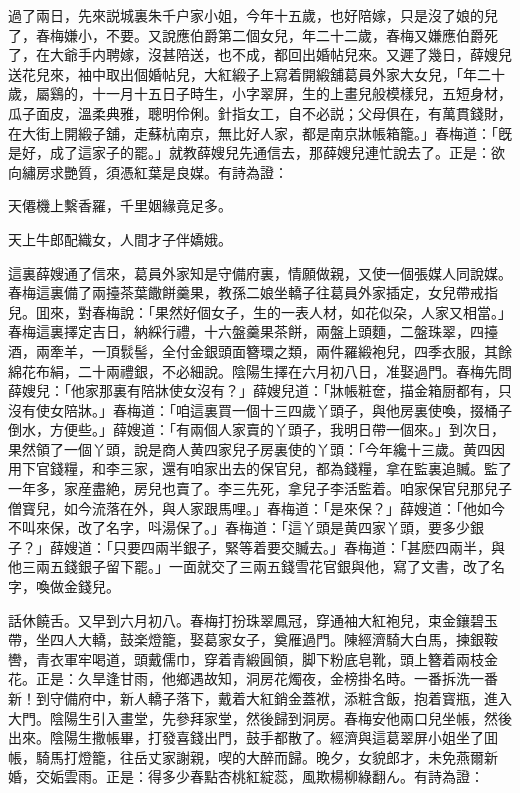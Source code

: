過了兩日，先來説城裏朱千户家小姐，今年十五歲，也好陪嫁，只是沒了娘的兒了，春梅嫌小，不要。又說應伯爵第二個女兒，年二十二歲，春梅又嫌應伯爵死了，在大爺手内聘嫁，沒甚陪送，也不成，都回出婚帖兒來。又遲了幾日，薛嫂兒送花兒來，袖中取出個婚帖兒，大紅緞子上寫着開緞舖葛員外家大女兒，「年二十歲，屬鷄的，十一月十五日子時生，小字翠屏，生的上畫兒般模樣兒，五短身材，瓜子面皮，溫柔典雅，聰明伶俐。針指女工，自不必説；父母俱在，有萬貫錢財，在大街上開緞子舖，走蘇杭南京，無比好人家，都是南京牀帳箱籠。」春梅道：「旣是好，成了這家子的罷。」就教薛嫂兒先通信去，那薛嫂兒連忙說去了。正是：欲向繡房求艷質，須憑紅葉是良媒。有詩為證：

天僊機上繫香羅，千里姻緣竟足多。

天上牛郎配織女，人間才子伴嬌娥。

這裏薛嫂通了信來，葛員外家知是守備府裏，情願做親，又使一個張媒人同說媒。春梅這裏備了兩擡茶葉饊餅羹果，教孫二娘坐轎子往葛員外家插定，女兒帶戒指兒。囬來，對春梅說：「果然好個女子，生的一表人材，如花似朶，人家又相當。」春梅這裏擇定吉日，納綵行禮，十六盤羹果茶餅，兩盤上頭麵，二盤珠翠，四擡酒，兩牽羊，一頂䯼髻，全付金銀頭面簪環之類，兩件羅緞袍兒，四季衣服，其餘綿花布絹，二十兩禮銀，不必細說。陰陽生擇在六月初八日，准娶過門。春梅先問薛嫂兒：「他家那裏有陪牀使女沒有？」薛嫂兒道：「牀帳粧奩，描金箱厨都有，只沒有使女陪牀。」春梅道：「咱這裏買一個十三四歲丫頭子，與他房裏使喚，掇桶子倒水，方便些。」薛嫂道：「有兩個人家賣的丫頭子，我明日帶一個來。」到次日，果然領了一個丫頭，說是商人黄四家兒子房裏使的丫頭：「今年纔十三歲。黄四因用下官錢糧，和李三家，還有咱家出去的保官兒，都為錢糧，拿在監裏追贓。監了一年多，家産盡絶，房兒也賣了。李三先死，拿兒子李活監着。咱家保官兒那兒子僧寳兒，如今流落在外，與人家跟馬哩。」春梅道：「是來保？」薛嫂道：「他如今不叫來保，改了名字，呌湯保了。」春梅道：「這丫頭是黄四家丫頭，要多少銀子？」薛嫂道：「只要四兩半銀子，緊等着要交贓去。」春梅道：「甚麽四兩半，與他三兩五錢銀子留下罷。」一面就交了三兩五錢雪花官銀與他，寫了文書，改了名字，喚做金錢兒。

話休饒舌。又早到六月初八。春梅打扮珠翠鳳冠，穿通袖大紅袍兒，束金鑲碧玉帶，坐四人大轎，鼓楽燈籠，娶葛家女子，奠雁過門。陳經濟騎大白馬，揀銀鞍轡，青衣軍牢喝道，頭戴儒巾，穿着青緞圓領，脚下粉底皂靴，頭上簪着兩枝金花。正是：久旱逢甘雨，他鄉遇故知，洞房花燭夜，金榜掛名時。一番拆洗一番新！到守備府中，新人轎子落下，戴着大紅銷金蓋袱，添粧含飯，抱着寳瓶，進入大門。陰陽生引入畫堂，先參拜家堂，然後歸到洞房。春梅安他兩口兒坐帳，然後出來。陰陽生撒帳畢，打發喜錢出門，鼓手都散了。經濟與這葛翠屏小姐坐了囬帳，騎馬打燈籠，往岳丈家謝親，喫的大醉而歸。晚夕，女貌郎才，未免燕爾新婚，交姤雲雨。正是：得多少春點杏桃紅綻蕊，風欺楊柳綠翻ん。有詩為證：

